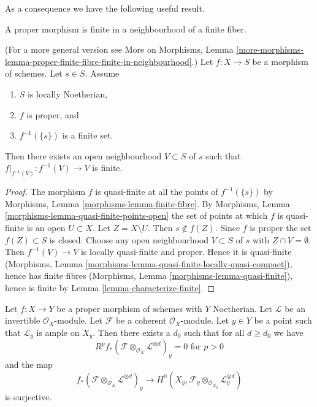 \noindent
As a consequence we have the following useful result.

\begin{lemma}
\label{lemma-proper-finite-fibre-finite-in-neighbourhood}
\begin{slogan}
A proper morphism is finite in a neighbourhood of a finite fiber.
\end{slogan}
(For a more general version see
More on Morphisms,
Lemma \ref{more-morphisms-lemma-proper-finite-fibre-finite-in-neighbourhood}.)
Let $f : X \to S$ be a morphism of schemes.
Let $s \in S$.
Assume
\begin{enumerate}
\item $S$ is locally Noetherian,
\item $f$ is proper, and
\item $f^{-1}(\{s\})$ is a finite set.
\end{enumerate}
Then there exists an open neighbourhood $V \subset S$ of $s$
such that $f|_{f^{-1}(V)} : f^{-1}(V) \to V$ is finite.
\end{lemma}

\begin{proof}
The morphism $f$ is quasi-finite at all the points of $f^{-1}(\{s\})$
by Morphisms, Lemma \ref{morphisms-lemma-finite-fibre}.
By Morphisms, Lemma \ref{morphisms-lemma-quasi-finite-points-open} the
set of points at which $f$ is quasi-finite is an open $U \subset X$.
Let $Z = X \setminus U$. Then $s \not \in f(Z)$. Since $f$ is proper
the set $f(Z) \subset S$ is closed. Choose any open neighbourhood
$V \subset S$ of $s$ with $Z \cap V = \emptyset$. Then
$f^{-1}(V) \to V$ is locally quasi-finite and proper.
Hence it is quasi-finite
(Morphisms, Lemma \ref{morphisms-lemma-quasi-finite-locally-quasi-compact}),
hence has finite fibres
(Morphisms, Lemma \ref{morphisms-lemma-quasi-finite}), hence
is finite by Lemma \ref{lemma-characterize-finite}.
\end{proof}

\begin{lemma}
\label{lemma-ample-on-fibre}
Let $f : X \to Y$ be a proper morphism of schemes with $Y$ Noetherian.
Let $\mathcal{L}$ be an invertible $\mathcal{O}_X$-module.
Let $\mathcal{F}$ be a coherent $\mathcal{O}_X$-module.
Let $y \in Y$ be a point such that $\mathcal{L}_y$ is ample on $X_y$.
Then there exists a $d_0$ such that for all $d \geq d_0$ we have
$$
R^pf_*(\mathcal{F} \otimes_{\mathcal{O}_X} \mathcal{L}^{\otimes d})_y = 0
\text{ for }p > 0
$$
and the map
$$
f_*(\mathcal{F} \otimes_{\mathcal{O}_X} \mathcal{L}^{\otimes d})_y
\longrightarrow
H^0(X_y, \mathcal{F}_y \otimes_{\mathcal{O}_{X_y}} \mathcal{L}_y^{\otimes d})
$$
is surjective.
\end{lemma}

